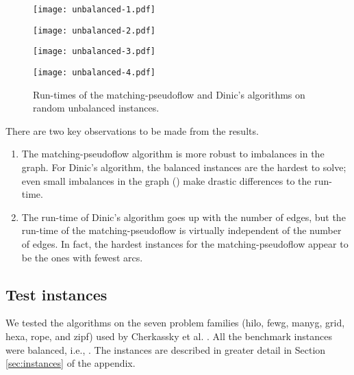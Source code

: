 \documentclass{article}
\begin{document}
\begin{figure}[ht]
\begin{minipage}{0.49\linewidth}
\begin{center}
\centerline{\texttt{[image: unbalanced-1.pdf]}}
\centerline{\texttt{[image: unbalanced-2.pdf]}}
\end{center}
\end{minipage}\hfill
\begin{minipage}{0.49\linewidth}
\begin{center}
\centerline{\texttt{[image: unbalanced-3.pdf]}}
\centerline{\texttt{[image: unbalanced-4.pdf]}}
\end{center}
\end{minipage}
\caption{\label{fig:unbalanced} Run-times of the {\sf matching-pseudoflow} and Dinic's algorithms on random unbalanced instances.}
\end{figure}

There are two key observations to be made from the results.
\begin{enumerate}
\item The {\sf matching-pseudoflow} algorithm is more robust to imbalances in the graph.  For Dinic's algorithm, the balanced instances are the hardest to solve; even small imbalances in the graph () make drastic differences to the run-time.
\item The run-time of Dinic's algorithm goes up with the number of edges, but the run-time of the {\sf matching-pseudoflow} is virtually independent of the number of edges. In fact, the hardest instances for the {\sf matching-pseudoflow} appear to be the ones with fewest arcs.
\end{enumerate}

\subsection{Test instances}

We tested the algorithms on the seven problem families ({\sf hilo},
{\sf fewg}, {\sf manyg}, {\sf grid}, {\sf hexa}, {\sf rope}, and {\sf
zipf}) used by Cherkassky et al. \cite{CheGMSS98}. All the benchmark
instances were balanced, i.e., .  The instances are
described in greater detail in Section \ref{sec:instances} of the
appendix.
\end{document}
